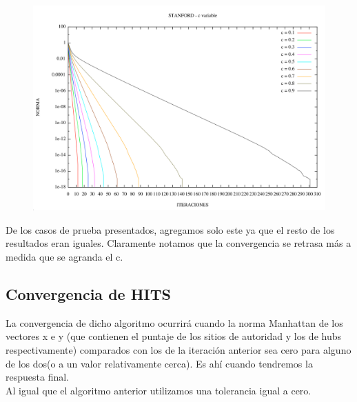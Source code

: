
\begin{figure}[!htb]
\begin{center}
  \includegraphics[scale=0.5]{imagenes/pagerank_stanford_norma.png}
    \end{center}
\end{figure}

De los casos de prueba presentados, agregamos solo este ya que el resto de los resultados eran iguales. Claramente notamos que la convergencia se retrasa más a medida que se agranda el c. 

\clearpage

\subsection {Convergencia de HITS}

La convergencia de dicho algoritmo ocurrirá cuando la norma Manhattan de los vectores x e y (que contienen el puntaje de los sitios de autoridad y los de hubs respectivamente) comparados con los de la iteración anterior 
sea cero para alguno de los dos(o a un valor relativamente cerca). Es ahí cuando tendremos la respuesta final.\\
Al igual que el algoritmo anterior utilizamos una tolerancia igual a cero.

